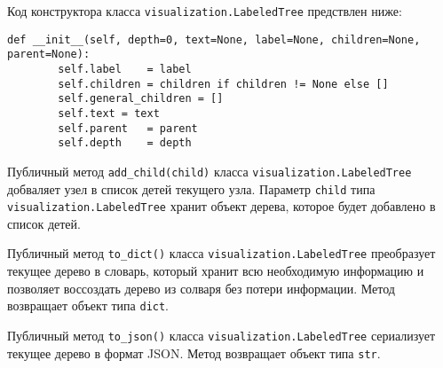 Код конструктора класса \texttt{visualization.LabeledTree} предствлен ниже:
\medskip
\begin{lstlisting}[style=Python]
    def __init__(self, depth=0, text=None, label=None, children=None, parent=None):
        self.label    = label
        self.children = children if children != None else []
        self.general_children = []
        self.text = text
        self.parent   = parent
        self.depth    = depth
\end{lstlisting}
\medskip

Публичный метод \texttt{add\_child(child)} класса \texttt{visualization.Labeled\-Tree} добваляет узел в список детей текущего узла. Параметр \texttt{child} типа \texttt{vi\-sualization.LabeledTree} хранит объект дерева, которое будет добавлено в список детей.

Публичный метод \texttt{to\_dict()} класса \texttt{visualization.LabeledTree} преобразует текущее дерево в словарь, который хранит всю необходимую информацию и позволяет воссоздать дерево из солваря без потери информации. Метод возвращает объект типа \texttt{dict}.

Публичный метод \texttt{to\_json()} класса \texttt{visualization.LabeledTree} сериализует текущее дерево в формат JSON. Метод возвращает объект типа \texttt{str}.